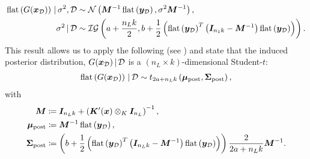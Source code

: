 \begin{equation*}
	\begin{aligned}
		\operatorname{flat}\left(G(\bm{x}_{\mathcal{D}})\right) \, | \, \sigma^2, \mathcal{D} & \sim \mathcal{N}\left(\bm{M}^{-1} \operatorname{flat}\left(\bm{y}_{\mathcal{D}}\right), \sigma^2 \bm{M}^{-1}\right), \\
		\sigma^{2} \, | \, \mathcal{D} & \sim \mathcal{IG}\left(a + \frac{n_L k}{2}, b + \frac{1}{2} \left(\operatorname{flat}\left(\bm{y}_{\mathcal{D}}\right)^T \left(\bm{I}_{n_1 k} - \bm{M}^{-1}\right) \operatorname{flat}\left(\bm{y}_{\mathcal{D}}\right)\right)\right).
	\end{aligned}
\end{equation*}
This result allows us to apply the following  (see \citet{bayesiantheory2009}) and state that the induced posterior distribution, $G(\bm{x}_{\mathcal{D}}) \, | \, \mathcal{D}$ is a $(n_L \times k)$-dimensional Student-$t$:
\begin{equation*}
	\begin{aligned}
		\operatorname{flat}\left(G(\bm{x}_{\mathcal{D}})\right) \, | \, \mathcal{D} \sim t_{2a + n_L k}\left(\bm{\mu}_{\mathrm{post}}, \bm{\Sigma}_{\mathrm{post}}\right),
	\end{aligned}
\end{equation*}
with
\begin{equation*}
	\begin{aligned}
		\bm{M} & \coloneqq \bm{I}_{n_L k} + \left(\bm{K}'(\bm{x}) \otimes_K \bm{I}_{n_L}\right)^{-1}, \\
		\bm{\mu}_{\mathrm{post}} & \coloneqq \bm{M}^{-1} \operatorname{flat}\left(\bm{y}_{\mathcal{D}}\right), \\
		\bm{\Sigma}_{\mathrm{post}} & \coloneqq \left(b + \frac{1}{2} \left(\operatorname{flat}\left(\bm{y}_{\mathcal{D}}\right)^T \left(\bm{I}_{n_L k} - \bm{M}^{-1}\right) \operatorname{flat}\left(\bm{y}_{\mathcal{D}}\right)\right)\right) \frac{2}{2a + n_L k} \bm{M}^{-1}.
	\end{aligned}
\end{equation*}

